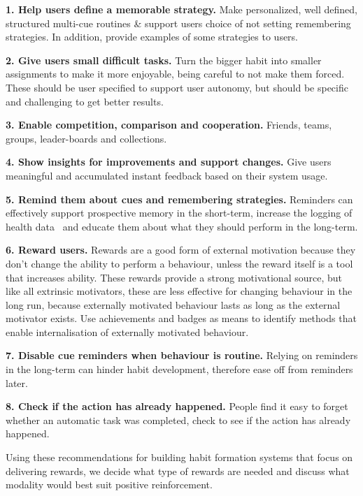 \textbf{1. Help users define a memorable strategy.}\newline
Make personalized, well defined, structured multi-cue routines \& support users choice of not setting remembering strategies. In addition, provide examples of some strategies to users.

\textbf{2. Give users small difficult tasks.}\newline
Turn the bigger habit into smaller assignments to make it more enjoyable, being careful to not make them forced. These should be user specified to support user autonomy, but should be specific and challenging to get better results.

\textbf{3. Enable competition, comparison and cooperation.}\newline
Friends, teams, groups, leader-boards and collections.

\textbf{4. Show insights for improvements and support changes.}\newline
Give users meaningful and accumulated instant feedback based on their system usage.

\textbf{5. Remind them about cues and remembering strategies.}\newline
Reminders can effectively support prospective memory in the short-term, increase the logging of health data~\cite{the_power_of_logging_mobile_notifications} and educate them about what they should perform in the long-term.

\textbf{6. Reward users.}\newline
Rewards are a good form of external motivation because they don't change the ability to perform a behaviour, unless the reward itself is a tool that increases ability. These rewards provide a strong motivational source, but like all extrinsic motivators, these are less effective for changing behaviour in the long run, because externally motivated behaviour lasts as long as the external motivator exists. Use achievements and badges as means to identify methods that enable internalisation of externally motivated behaviour.

\textbf{7. Disable cue reminders when behaviour is routine.}\newline
Relying on reminders in the long-term can hinder habit development, therefore ease off from reminders later.

\textbf{8. Check if the action has already happened.}\newline
People find it easy to forget whether an automatic task was completed, check to see if the action has already happened.



Using these recommendations for building habit formation systems that focus on delivering rewards, we decide what type of rewards are needed and discuss what modality would best suit positive reinforcement.
